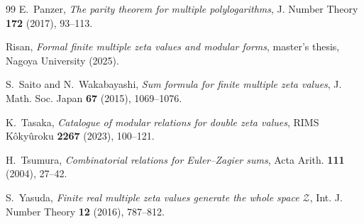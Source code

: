 \documentclass[12pt]{amsart}
\numberwithin{equation}{section}
\theoremstyle{plain}
\begin{document}
\begin{thebibliography}{99}
E.~Panzer,
\textit{The parity theorem for multiple polylogarithms},
J. Number Theory \textbf{172} (2017), 93--113.

Risan,
\textit{Formal finite multiple zeta values and modular forms},
master's thesis, Nagoya University (2025).

S.~Saito and N.~Wakabayashi,
\textit{Sum formula for finite multiple zeta values},
J. Math. Soc. Japan \textbf{67} (2015), 1069--1076.

K.~Tasaka,
\textit{Catalogue of modular relations for double zeta values},
RIMS K\^oky\^uroku \textbf{2267} (2023), 100--121.

H.~Tsumura,
\textit{Combinatorial relations for Euler--Zagier sums},
Acta Arith. \textbf{111} (2004), 27--42.

S.~Yasuda,
\textit{Finite real multiple zeta values generate the whole space $\mathcal Z$},
Int. J. Number Theory \textbf{12} (2016), 787--812.

\end{thebibliography}
\end{document}
